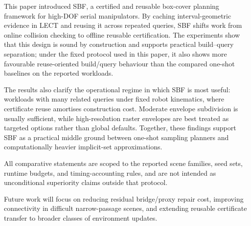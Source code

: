 \documentclass[journal]{IEEEtran}
\DeclareRobustCommand{\textsc}[1]{\textnormal{\MakeUppercase{#1}}}
\newcommand{\sbf}{\textsc{SBF}}
\begin{document}
This paper introduced \sbf{}, a certified and reusable box-cover planning
framework for high-DOF serial manipulators. By caching interval-geometric
evidence in LECT and reusing it across repeated queries, \sbf{} shifts work from
online collision checking to offline reusable certification. The experiments
show that this design is sound by construction and supports practical
build--query separation; under the fixed protocol used in this paper, it also
shows more favourable reuse-oriented build/query behaviour than the compared
one-shot baselines on the reported workloads.

The results also clarify the operational regime in which \sbf{} is most useful:
workloads with many related queries under fixed robot kinematics, where
certificate reuse amortises construction cost. Moderate envelope subdivision is
usually sufficient, while high-resolution raster envelopes are best treated as
targeted options rather than global defaults. Together, these findings support
\sbf{} as a practical middle ground between one-shot sampling planners and
computationally heavier implicit-set approximations.

All comparative statements are scoped to the reported scene families, seed
sets, runtime budgets, and timing-accounting rules, and are not intended as
unconditional superiority claims outside that protocol.

Future work will focus on reducing residual bridge/proxy repair cost, improving
connectivity in difficult narrow-passage scenes, and extending reusable
certificate transfer to broader classes of environment updates.
\end{document}
